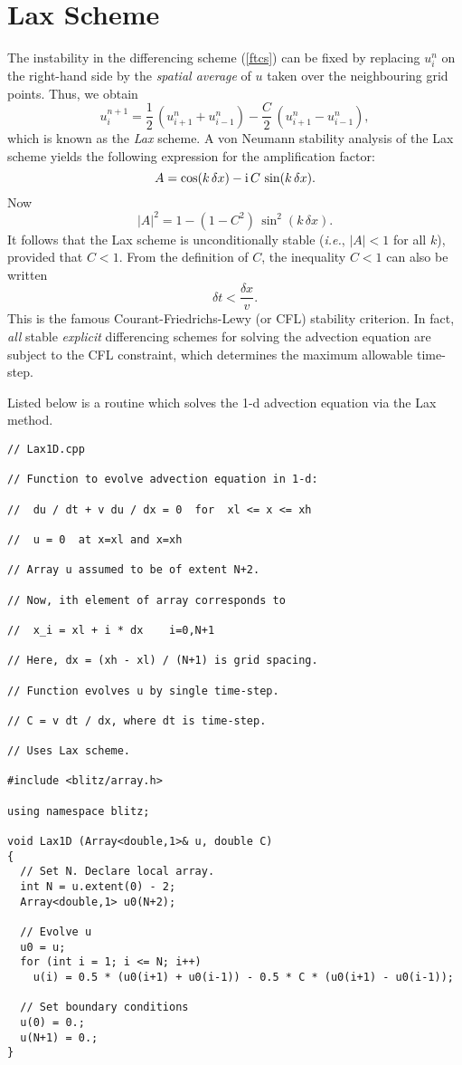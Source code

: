 \section{Lax Scheme}
The instability in the differencing scheme (\ref{ftcs}) can be fixed by replacing
$u_i^n$ on the right-hand side by the {\em spatial average} of $u$ taken over the neighbouring grid
points. Thus, we obtain
\begin{equation}\label{lax}
u_i^{n+1} = \frac{1}{2}\,(u_{i+1}^n+u_{i-1}^n) -\frac{C}{2}\,(u_{i+1}^n-u_{i-1}^n),
\end{equation}
which is known as the {\em Lax} scheme. A von Neumann stability analysis
of the Lax scheme yields the following expression for the amplification
factor:
\begin{equation}
A = \cos (k\,\delta x) - {\rm i} \,C\,\sin (k \,\delta x).
\end{equation}
Now
\begin{equation}\label{laxa}
|A|^2 = 1 - (1-C^2)\,\sin^2(k\,\delta x).
\end{equation}
It follows that the Lax scheme is unconditionally stable ({\em i.e.}, $|A| < 1$
for all $k$), provided that $C<1$. From the definition of $C$, the
inequality $C<1$ can also be written
\begin{equation}
\delta t < \frac{\delta x}{v}.
\end{equation}
This is the famous Courant-Friedrichs-Lewy (or CFL) stability criterion.
In fact, {\em all} stable {\em explicit} differencing schemes for solving the advection equation
are subject to the CFL constraint, which determines  the maximum allowable time-step.

Listed below is a routine which solves the 1-d advection equation
via the Lax method.
{\small\begin{verbatim}
// Lax1D.cpp

// Function to evolve advection equation in 1-d:

//  du / dt + v du / dx = 0  for  xl <= x <= xh

//  u = 0  at x=xl and x=xh

// Array u assumed to be of extent N+2.

// Now, ith element of array corresponds to

//  x_i = xl + i * dx    i=0,N+1

// Here, dx = (xh - xl) / (N+1) is grid spacing.

// Function evolves u by single time-step.

// C = v dt / dx, where dt is time-step.

// Uses Lax scheme.

#include <blitz/array.h>

using namespace blitz;

void Lax1D (Array<double,1>& u, double C)
{
  // Set N. Declare local array.
  int N = u.extent(0) - 2;
  Array<double,1> u0(N+2);

  // Evolve u
  u0 = u;
  for (int i = 1; i <= N; i++)
    u(i) = 0.5 * (u0(i+1) + u0(i-1)) - 0.5 * C * (u0(i+1) - u0(i-1));

  // Set boundary conditions
  u(0) = 0.;
  u(N+1) = 0.;
}
\end{verbatim}}

